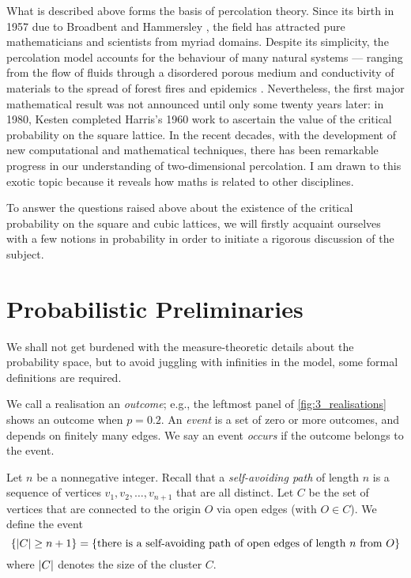 \documentclass[a4paper, 12pt]{article}
\begin{document}
What is described above forms the basis of percolation theory. Since its birth in 1957 due to Broadbent and Hammersley \autocite*[693]{broadbent_hammersley_1957}, the field has attracted pure mathematicians and scientists from myriad domains. Despite its simplicity, the percolation model accounts for the behaviour of many natural systems --- ranging from the flow of fluids through a disordered porous medium and conductivity of materials to the spread of forest fires and epidemics \autocite[60]{gennes_2000}. Nevertheless, the first major mathematical result was not announced until only some twenty years later: in 1980, Kesten \autocite*[41]{kesten_1980} completed Harris's 1960 work \autocite*[13]{harris_1960} to ascertain the value of the critical probability on the square lattice. In the recent decades, with the development of new computational and mathematical techniques, there has been remarkable progress in our understanding of two-dimensional percolation. I am drawn to this exotic topic because it reveals how maths is related to other disciplines.

To answer the questions raised above about the existence of the critical probability on the square and cubic lattices, we will firstly acquaint ourselves with a few notions in probability in order to initiate a rigorous discussion of the subject.

\section{Probabilistic Preliminaries}\label{ch:prelims}
We shall not get burdened with the measure-theoretic details about the probability space, but to avoid juggling with infinities in the model, some formal definitions are required.

\begin{defn}\label{defn:outcome_and_event}
We call a realisation an \textit{outcome}; e.g., the leftmost panel of \cref{fig:3_realisations} shows an outcome when $p = 0.2$. An \textit{event} is a set of zero or more outcomes, and depends on finitely many edges. We say an event \textit{occurs} if the outcome belongs to the event.
\end{defn}

\begin{ex}\label{ex:cluster_of_size_n}
Let $n$ be a nonnegative integer. Recall that a \textit{self-avoiding path} of length $n$ is a sequence of vertices $v_1, v_2, \dots, v_{n + 1}$ that are all distinct.
Let $C$ be the set of vertices that are connected to the origin $O$ via open edges (with $O \in C$). We define the event
\[
\{\lvert C \rvert \geq n + 1\}
= \{\text{there is a self-avoiding path of open edges of length } n \text{ from } O\}
\]
where $\lvert C \rvert$ denotes the size of the cluster $C$.

\end{ex}
\end{document}
